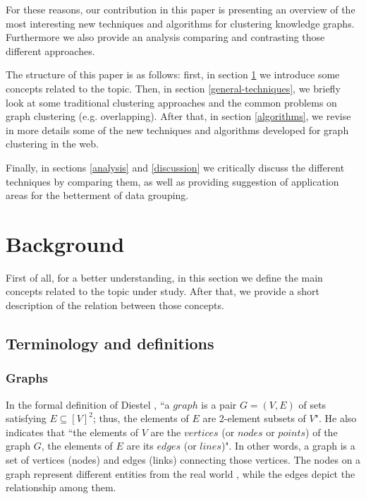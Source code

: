 \documentclass[runningheads]{llncs}
\begin{document}
For these reasons, our contribution in this paper is presenting an overview of the most interesting new techniques and algorithms for clustering knowledge graphs. Furthermore we also provide an analysis comparing and contrasting those different approaches.

The structure of this paper is as follows: first, in section \ref{background} we introduce some concepts related to the topic. Then, in section \ref{general-techniques}, we briefly look at some traditional clustering approaches and the common problems on graph clustering (e.g. overlapping). After that, in section \ref{algorithms}, we revise in more details some of the new techniques and algorithms developed for graph clustering in the web.

Finally, in sections \ref{analysis} and \ref{discussion} we critically discuss the different techniques by comparing them, as well as providing suggestion of application areas for the betterment of data grouping. 


\section{Background} \label{background}
First of all, for a better understanding, in this section we define the main concepts related to the topic under study. After that, we provide a short description of the relation between those concepts.

\subsection{Terminology and definitions} \label{terminology}

\subsubsection{Graphs} \label{graphs}
In the formal definition of Diestel \cite{Diestel}, ``a $graph$ is a pair $G = (V, E)$ of sets satisfying $E \subseteq [V]^2$; thus, the elements of $E$ are 2-element subsets of $V$". He also indicates that ``the elements of $V$ are the $vertices$ (or $nodes$ or $points$) of the graph $G$, the elements of $E$ are its $edges$ (or $lines$)". In other words, a graph is a set of vertices (nodes) and edges (links) connecting those vertices. The nodes on a graph represent different entities from the real world \cite{Robinson}, while the edges depict the relationship among them.
\end{document}
